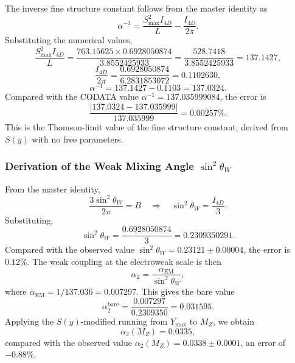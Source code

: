 \documentclass[12pt,oneside,openany]{book}
\begin{document}
The inverse fine structure constant follows from the master identity as
\begin{equation}
\alpha^{-1} = \frac{S_{\max}^2 I_{4D}}{L} - \frac{I_{4D}}{2\pi}.
\label{eq:alpha-inv}
\end{equation}
Substituting the numerical values,
\begin{equation}
\frac{S_{\max}^2 I_{4D}}{L} = \frac{763.15625 \times 0.6928050874}{3.8552425933} = \frac{528.7418}{3.8552425933} = 137.1427,
\label{eq:alpha-term1}
\end{equation}
\begin{equation}
\frac{I_{4D}}{2\pi} = \frac{0.6928050874}{6.2831853072} = 0.1102630,
\label{eq:alpha-term2}
\end{equation}
\begin{equation}
\boxed{\alpha^{-1} = 137.1427 - 0.1103 = 137.0324.}
\label{eq:alpha-final}
\end{equation}
Compared with the CODATA value $\alpha^{-1} = 137.035999084$, the error is
\begin{equation}
\frac{|137.0324 - 137.035999|}{137.035999} = 0.00257\%.
\label{eq:alpha-error}
\end{equation}
This is the Thomson-limit value of the fine structure constant, derived from $S(y)$ with no free parameters.

\subsubsection{Derivation of the Weak Mixing Angle $\sin^2\theta_W$}

From the master identity,
\begin{equation}
\frac{3\sin^2\theta_W}{2\pi} = B \quad \Longrightarrow \quad \sin^2\theta_W = \frac{I_{4D}}{3}.
\label{eq:sin2}
\end{equation}
Substituting,
\begin{equation}
\boxed{\sin^2\theta_W = \frac{0.6928050874}{3} = 0.2309350291.}
\label{eq:sin2-final}
\end{equation}
Compared with the observed value $\sin^2\theta_W = 0.23121 \pm 0.00004$, the error is $0.12\%$. The weak coupling at the electroweak scale is then
\begin{equation}
\alpha_2 = \frac{\alpha_{\mathrm{EM}}}{\sin^2\theta_W},
\label{eq:alpha2-def}
\end{equation}
where $\alpha_{\mathrm{EM}} = 1/137.036 = 0.007297$. This gives the bare value
\begin{equation}
\alpha_2^{\mathrm{bare}} = \frac{0.007297}{0.2309350} = 0.031595.
\label{eq:alpha2-bare}
\end{equation}
Applying the $S(y)$-modified running from $Y_{\max}$ to $M_Z$, we obtain
\begin{equation}
\boxed{\alpha_2(M_Z) = 0.0335,}
\label{eq:alpha2-final}
\end{equation}
compared with the observed value $\alpha_2(M_Z) = 0.0338 \pm 0.0001$, an error of $-0.88\%$.
\end{document}
